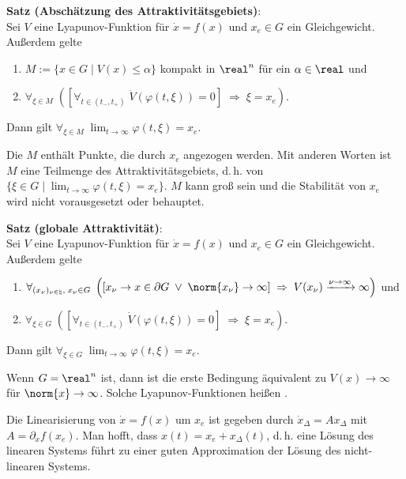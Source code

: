 \linie

\textbf{Satz (Abschätzung des Attraktivitätsgebiets)}:\\
Sei $V$ eine Lyapunov-Funktion für $\dot{x} = f(x)$ und $x_e \in G$ ein Gleichgewicht.
Außerdem gelte
\begin{enumerate}
    \item
    $M := \{x \in G \;|\; V(x) \le \alpha\}$ kompakt in $\real^n$ für ein $\alpha \in \real$ und

    \item
    $\forall_{\xi \in M}\;
    ([\forall_{t \in (t_-, t_+)}\; \dot{V}(\varphi(t, \xi)) = 0] \;\Rightarrow\;
    \xi = x_e)$.
\end{enumerate}
Dann gilt $\forall_{\xi \in M}\; \lim_{t \to \infty} \varphi(t, \xi) = x_e$.

Die  $M$ enthält Punkte, die durch $x_e$ angezogen werden.
Mit anderen Worten ist $M$ eine Teilmenge des Attraktivitätsgebiets, d.\,h. von\\
$\{\xi \in G \;|\; \lim_{t \to \infty} \varphi(t, \xi) = x_e\}$.
$M$ kann groß sein und die Stabilität von $x_e$ wird nicht vorausgesetzt oder behauptet.

\linie

\textbf{Satz (globale Attraktivität)}:\\
Sei $V$ eine Lyapunov-Funktion für $\dot{x} = f(x)$ und $x_e \in G$ ein Gleichgewicht.
Außerdem gelte
\begin{enumerate}
    \item
    $\forall_{(x_\nu)_{\nu \in \natural},\; x_\nu \in G}\;
    \left(\left[x_\nu \to x \in \partial G \;\lor\; \norm{x_\nu} \to \infty\right] \;\Rightarrow\;
    V(x_\nu) \xrightarrow{\nu \to \infty} \infty\right)$ und

    \item
    $\forall_{\xi \in G}\;
    ([\forall_{t \in (t_-, t_+)}\; \dot{V}(\varphi(t, \xi)) = 0] \;\Rightarrow\;
    \xi = x_e)$.
\end{enumerate}
Dann gilt $\forall_{\xi \in G}\; \lim_{t \to \infty} \varphi(t, \xi) = x_e$.

Wenn $G = \real^n$ ist, dann ist die erste Bedingung äquivalent zu $V(x) \to \infty$
für $\norm{x} \to \infty$.
Solche Lyapunov-Funktionen heißen .

\linie

Die Linearisierung von $\dot{x} = f(x)$ um $x_e$ ist gegeben durch
$\dot{x}_\Delta = Ax_\Delta$ mit $A = \partial_x f(x_e)$.
Man hofft, dass $x(t) = x_e + x_\Delta(t)$, d.\,h. eine Lösung des linearen Systems führt
zu einer guten Approximation der Lösung des nicht-linearen Systems.

